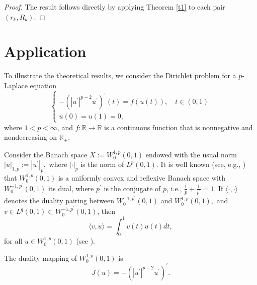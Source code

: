 \documentclass{birkjour}
\theoremstyle{definition}
\theoremstyle{remark}
\numberwithin{equation}{section}
\begin{document}
\begin{proof}
The result follows directly by applying Theorem \ref{t1} to each pair $%
(r_{k},R_{k}).$
\end{proof}

\section{Application}

To illustrate the theoretical results, we consider the Dirichlet problem for
a $p$-Laplace equation
\begin{equation}
\begin{cases}
-\left( \left\vert u^{\prime }\right\vert ^{p-2}u^{\prime }\right) ^{\prime
}(t)=f(u(t)),\quad t\in \left( 0,1\right) \\
u(0)=u(1)=0,%
\end{cases}
\label{pa}
\end{equation}%
where $1<p<\infty $, and $f:\mathbb{R}\rightarrow \mathbb{R}$ is a
continuous function that is nonnegative and nondecreasing on $\mathbb{R}%
_{+}. $

Consider the Banach space $X:=W_{0}^{1,p}\left( 0,1\right) $ endowed with
the usual norm $|u|_{1,p}:=|u^{\prime }|_{p},$ where $\left\vert \cdot
\right\vert _{p}$ is the norm of $L^{p}\left( 0,1\right) $. It is well known
(see, e.g., \cite[Chapter~1.2]{djm}) that $W_{0}^{1,p}(0,1)$ is a uniformly
convex and reflexive Banach space with $W_{0}^{-1,p^{\prime }}(0,1)$ its
dual, where $p^{\prime }$ is the conjugate of $p$, i.e., $\frac{1}{p}+\frac{1%
}{p^{\prime }}=1$. If $\langle \cdot ,\cdot \rangle $ denotes the duality
pairing between $W_{0}^{-1,p^{\prime }}(0,1)$ and $W_{0}^{1,p}(0,1),$ and $%
v\in L^{q}(0,1)\subset W_{0}^{-1,p^{\prime }}(0,1)$, then
\begin{equation*}
\langle v,u\rangle =\int_{0}^{1}v(t)u(t)dt,
\end{equation*}%
for all $u\in W_{0}^{1,p}(0,1)$ (see \cite[Proposition~8.14]{b}).

The duality mapping of $W_{0}^{1,p}\left( 0,1\right) $ is%
\begin{equation*}
J\left( u\right) =-\left( \left\vert u^{\prime }\right\vert ^{p-2}u^{\prime
}\right) ^{\prime }.
\end{equation*}
\end{document}
